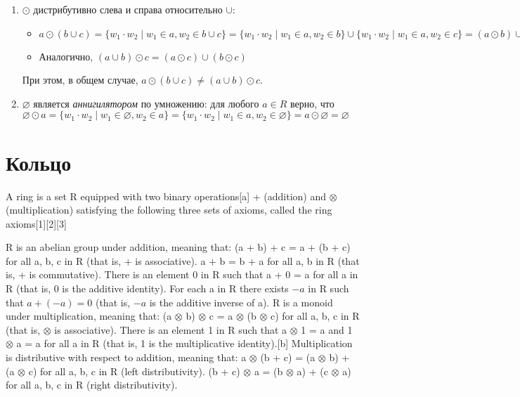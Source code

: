 \begin{example}
\begin{enumerate}
\item $\odot$ дистрибутивно слева и справа относительно $\cup$:
\begin{itemize}
	\item $a \odot (b \cup c) = \{ w_1 \cdot w_2 \mid  w_1 \in a, w_2 \in b \cup c\} = \{ w_1 \cdot w_2 \mid  w_1 \in a, w_2 \in b \} \cup  \{ w_1 \cdot w_2 \mid  w_1 \in a, w_2 \in c \} =  (a \odot b) \cup (a \odot c)$
    \item Аналогично, $(a \cup b) \odot c = (a \odot c) \cup (b \odot c)$
\end{itemize}
При этом, в общем случае, $a \odot (b \cup c) \neq (a \cup b) \odot c$.


\item $\varnothing$ является \textit{аннигилятором} по умножению: для любого $a \in R$ верно, что
$\varnothing \odot a =  \{ w_1 \cdot w_2 \mid w_1 \in \varnothing, w_2 \in a \} =  \{ w_1 \cdot w_2 \mid w_1 \in a, w_2 \in \varnothing \} = a \odot \varnothing = \varnothing$

\end{enumerate}

\end{example}

\section{Кольцо}


A ring is a set R equipped with two binary operations[a] + (addition) and $\otimes$ (multiplication) satisfying the following three sets of axioms, called the ring axioms[1][2][3]

R is an abelian group under addition, meaning that:
(a + b) + c = a + (b + c) for all a, b, c in R   (that is, + is associative).
a + b = b + a for all a, b in R   (that is, + is commutative).
There is an element 0 in R such that a + 0 = a for all a in R   (that is, 0 is the additive identity).
For each a in R there exists $-a$ in R such that $a + (-a) = 0$   (that is, $-a$ is the additive inverse of a).
R is a monoid under multiplication, meaning that:
(a $\otimes$ b) $\otimes$ c = a $\otimes$ (b $\otimes$ c) for all a, b, c in R   (that is, $\otimes$ is associative).
There is an element 1 in R such that a $\otimes$ 1 = a and 1 $\otimes$ a = a for all a in R   (that is, 1 is the multiplicative identity).[b]
Multiplication is distributive with respect to addition, meaning that:
a $\otimes$ (b + c) = (a $\otimes$ b) + (a $\otimes$ c) for all a, b, c in R   (left distributivity).
(b + c) $\otimes$ a = (b $\otimes$ a) + (c $\otimes$ a) for all a, b, c in R   (right distributivity).


